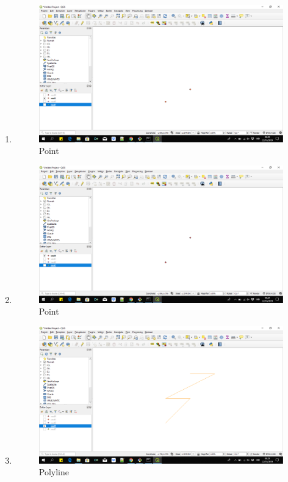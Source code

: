 \begin{enumerate}
	\item 
	
	\begin{figure}[H]
		\includegraphics[width=12cm]{figures/1174038/3.PNG}
		\centering
		\caption{Point}
	\end{figure}
	
	\item 
	
	\begin{figure}[H]
		\includegraphics[width=12cm]{figures/1174038/4.PNG}
		\centering
		\caption{Point}
	\end{figure}
	
	\item 
	
	\begin{figure}[H]
		\includegraphics[width=12cm]{figures/1174038/5.PNG}
		\centering
		\caption{Polyline}
	\end{figure}
	

\end{enumerate}
